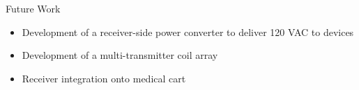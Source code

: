 \documentclass[final,t]{beamer}
\begin{document}
\begin{frame}{}
\begin{columns}[t]
\begin{column}{.225\paperwidth}
\begin{block}{Future Work}
		\begin{itemize}
				\item[\textcolor{UMNmaroon}{\textbullet}] Development of a receiver-side power converter to deliver 120 VAC to devices
				\item[\textcolor{UMNmaroon}{\textbullet}] Development of a multi-transmitter coil array
				\item[\textcolor{UMNmaroon}{\textbullet}] Receiver integration onto medical cart
		\end{itemize} 
		\end{block}
				
				
			\end{column}

\end{columns}

\end{frame}
\end{document}
